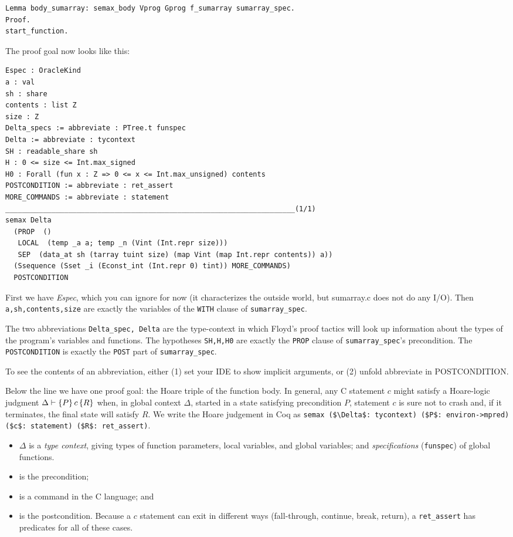 \documentclass[12pt,fleqn,openany,oneside,showtrims]{memoir}
\begin{document}
\begin{lstlisting}
Lemma body_sumarray: semax_body Vprog Gprog f_sumarray sumarray_spec.
Proof.
start_function.
\end{lstlisting}
The proof goal now looks like this:\label{refcard:body-sumarray1}
\begin{lstlisting}
Espec : OracleKind
a : val
sh : share
contents : list Z
size : Z
Delta_specs := abbreviate : PTree.t funspec
Delta := abbreviate : tycontext
SH : readable_share sh
H : 0 <= size <= Int.max_signed
H0 : Forall (fun x : Z => 0 <= x <= Int.max_unsigned) contents
POSTCONDITION := abbreviate : ret_assert
MORE_COMMANDS := abbreviate : statement
_____________________________________________________________________(1/1)
semax Delta
  (PROP  ()
   LOCAL  (temp _a a; temp _n (Vint (Int.repr size)))
   SEP  (data_at sh (tarray tuint size) (map Vint (map Int.repr contents)) a))
  (Ssequence (Sset _i (Econst_int (Int.repr 0) tint)) MORE_COMMANDS)
  POSTCONDITION
\end{lstlisting}
First we have \emph{Espec}, which you can ignore for now (it
characterizes the outside world, but sumarray.c does not
do any I/O).  Then \lstinline{a,sh,contents,size}
  are exactly the variables of the \lstinline{WITH} clause
  of \lstinline{sumarray_spec}.

  The two abbreviations \lstinline{Delta_spec, Delta} are the
  type-context in which Floyd's proof tactics will look up
  information about the types of the program's variables and functions.
  The hypotheses \lstinline{SH,H,H0} are exactly the
  \lstinline{PROP} clause of \lstinline{sumarray_spec}'s precondition.
  The \lstinline{POSTCONDITION} is exactly the
  \lstinline{POST} part of \lstinline{sumarray_spec}.

  To see the contents of an abbreviation, either (1) set your IDE to show implicit arguments, or (2) \textsf{unfold abbreviate in POSTCONDITION}.

  Below the line we have one proof goal: the Hoare triple
  of the function body.  In general, any C statement $c$
  might satisfy a Hoare-logic judgment
  $\Delta\vdash\{P\}\,c\,\{R\}$ when, in global context $\Delta$,
  started in a state satisfying precondition $P$, statement $c$ is sure
  not to crash and, if it terminates, the final state will satisfy $R$.
  We write the Hoare judgement in Coq as\newline
\lstinline{semax ($\Delta$: tycontext) ($P$: environ->mpred) ($c$: statement) ($R$: ret_assert)}.
\begin{itemize}
\item[$\Delta$] is a \emph{type context}, giving types of function parameters, local variables, and global variables; and \emph{specifications} (\lstinline{funspec}) of global functions.
\item[$P$] is the precondition;
\item[$c$] is a command in the C language; and
\item[$R$] is the postcondition.  Because a $c$ statement can exit in different ways (fall-through, continue, break, return), a \lstinline{ret_assert}
has predicates for all of these cases.
\end{itemize}
\end{document}
